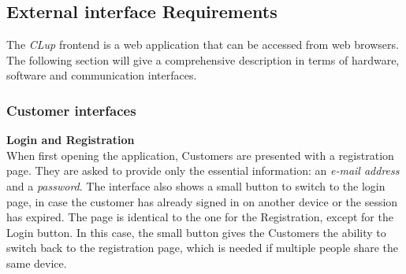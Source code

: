 \subsection{External interface Requirements}
The \emph{CLup} frontend is a web application that can be accessed from web browsers.  The following section will give a comprehensive description in terms of hardware, software and communication interfaces.

\subsubsection{Customer interfaces}
\textbf{Login and Registration}\\
\label{page:login}
When first opening the application, Customers are presented with a registration page. They are asked to provide only the essential information: an \emph{e-mail address} and a \emph{password}. The interface also shows a small button to switch to the login page, in case the customer has already signed in on another device or the session has expired. The page is identical to the one for the Registration, except for the Login button. In this case, the small button gives the Customers the ability to switch back to the registration page, which is needed if multiple people share the same device.
